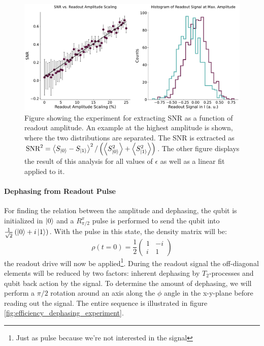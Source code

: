 \begin{figure}
    \raggedleft
    \includegraphics[width = 1.0 \linewidth]{Calibrations/Figures/SNR_vs_amplitude.pdf}
    \caption{Figure showing the experiment for extracting SNR as a function of readout amplitude. An example at the highest amplitude is shown, where the two distributions are separated. The SNR is extracted as $\text{SNR}^2 = \expval{S_{\ket{0}} - S_{\ket{1}}}^2/\left(\expval{S^2_{\ket{0}}} +\expval{S^2_{\ket{1}}}\right)$. The other figure displays the result of this analysis for all values of $\epsilon$ as well as a linear fit applied to it.}
    \label{fig:effiiency_results_SNR}
\end{figure}



\paragraph{Dephasing from Readout Pulse}
For finding the relation between the amplitude and dephasing, the qubit is initialized in $\ket{0}$ and a $R^x_{\pi/2}$ pulse is performed to send the qubit into $\frac{1}{\sqrt{2}}\left(\ket{0} + i\ket{1}\right)$. With the pulse in this state, the density matrix will be:
\begin{equation}
    \rho(t=0) = \frac12 \begin{pmatrix}1 & -i \\ i & 1\end{pmatrix}
\end{equation}
the readout drive will now be applied\footnote{Just as pulse because we're not interested in the signal}. During the readout signal the off-diagonal elements will be reduced by two factors: inherent dephasing by $T_2$-processes and qubit back action by the signal. To determine the amount of dephasing, we will perform a $\pi/2$ rotation around an axis along the $\phi$ angle in the x-y-plane before reading out the signal. The entire sequence is illustrated in figure \ref{fig:efficiency_dephasing_experiment}.

